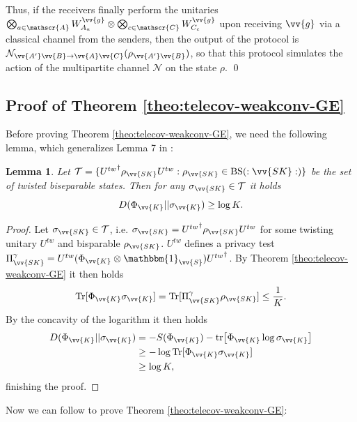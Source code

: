 \documentclass[aps,pra,twocolumn,superscriptaddress,longbibliography]{revtex4-1}
\def\Tr{\operatorname{Tr}}
\def\BS{\operatorname{BS}}
\newcommand{\mc}[1]{\mathcal{#1}}
\newcommand{\msc}[1]{\mathscr{#1}}
\newcommand{\bbm}[1]{\mathbbm{#1}}
\newtheorem{lemma}{Lemma}
\begin{document}
\begin{appendix}
Thus, if the receivers finally perform the unitaries $\bigotimes_{a\in\msc{A}}{W}_{A_a}^{\vv{g}}\otimes\bigotimes_{c\in\msc{C}}{W}_{C_c}^{\vv{g}}$ upon receiving $\vv{g}$ via a classical channel from the
senders, then the output of the protocol is $\mc{N}_{\vv{A'}\vv{B}\to\vv{A}\vv{C}}(\rho_{\vv{A'}\vv{B}})$, so that this
protocol simulates the action of the multipartite channel $\mathcal{N}$ on the state $\rho$.
\qed

\subsection{Proof of Theorem \ref{theo:telecov-weakconv-GE}}
Before proving Theorem \ref{theo:telecov-weakconv-GE}, we need the following lemma, which generalizes Lemma 7 in \cite{HHHO09}:
\begin{lemma}\label{bisep:lemma7}
Let $\mc{T}=\{{U^{tw}}^\dagger\rho_{\vv{SK}}U^{tw}:\rho_{\vv{SK}}\in \BS(:\vv{SK}:)\}$ be the set of twisted biseparable states. Then for any $\sigma_{\vv{SK}}\in\mc{T}$ it holds
\begin{equation}
D(\Phi_{\vv{K}}||\sigma_{\vv{K}})\geq\log{K}.
\end{equation}
\end{lemma}

\begin{proof}
Let $\sigma_{\vv{SK}}\in\mc{T}$, i.e. $\sigma_{\vv{SK}}={U^{tw}}^\dagger\rho_{\vv{SK}}U^{tw}$ for some twisting unitary $U^{tw}$ and bisparable $\rho_{\vv{SK}}$. $U^{tw}$ defines a privacy test $\Pi^\gamma_{\vv{SK}}=U^{tw}(\Phi_{\vv{K}}\otimes\bbm{1}_{\vv{S}}){U^{tw}}^\dagger$. By Theorem \ref{theo:telecov-weakconv-GE}  it then holds
\begin{equation}
\Tr[\Phi_{\vv{K}}\sigma_{\vv{K}}]=\Tr[\Pi^\gamma_{\vv{SK}}\rho_{\vv{SK}}]\leq\frac{1}{K}.
\end{equation}
By the concavity of the logarithm it then holds
\begin{align}
D(\Phi_{\vv{K}}||\sigma_{\vv{K}})&=-S(\Phi_{\vv{K}})-\tr[\Phi_{\vv{K}} \log{\sigma_{\vv{K}}}]\\
&\geq-\log\Tr[\Phi_{\vv{K}}\sigma_{\vv{K}}]\\
&\geq \log K,
\end{align}
finishing the proof.
\end{proof}

Now we can follow \cite{PLOB15} to prove Theorem \ref{theo:telecov-weakconv-GE}:


\end{appendix}
\end{document}

